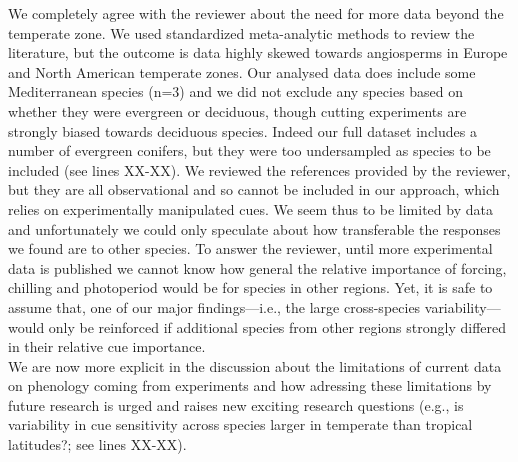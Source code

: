 \documentclass[11pt]{article}
\begin{document}

We completely agree with the reviewer about the need for more data beyond the temperate zone. We used standardized meta-analytic methods to review the literature, but the outcome is data highly skewed towards angiosperms in Europe and North American temperate zones. Our analysed data does include some Mediterranean species (n=3) and we did not exclude any species based on whether they were evergreen or deciduous, though cutting experiments are strongly biased towards deciduous species. Indeed our full dataset includes a number of evergreen conifers, but they were too undersampled as species to be included (see lines XX-XX). We reviewed the references provided by the reviewer, but they are all observational and so cannot be included in our approach, which relies on experimentally manipulated cues. We seem thus to be limited by data and unfortunately we could only speculate about how transferable the responses we found are to other species. To answer the reviewer, until more experimental data is published we cannot know how general the relative importance of forcing, chilling and photoperiod would be for species in other regions. Yet, it is safe to assume that, one of our major findings---i.e., the large cross-species variability---would only be reinforced if additional species from other regions strongly differed in their relative cue importance.\\

We are now more explicit in the discussion about the limitations of current data on phenology coming from experiments and how adressing these limitations by future research is urged and raises new exciting research questions (e.g., is variability in cue sensitivity across species larger in temperate than tropical latitudes?; see lines XX-XX). \\
\end{document}

